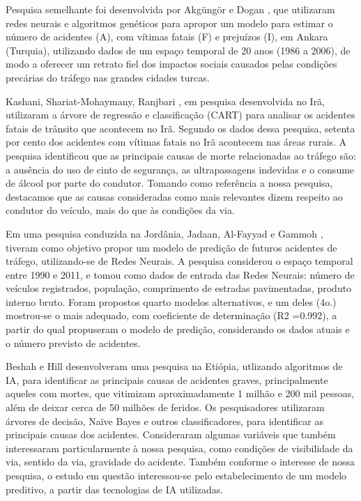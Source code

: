 Pesquisa semelhante foi desenvolvida por Akgüngör e Dogan \cite{akgungor2009artificial}, que utilizaram redes neurais e algoritmos genéticos para apropor um modelo para estimar o número de acidentes (A), com vítimas fatais (F) e prejuízos (I), em Ankara (Turquia), utilizando dados de um espaço temporal de 20 anos (1986 a 2006), de modo a oferecer um retrato fiel dos impactos sociais causados pelas condições precárias do tráfego nas grandes cidades turcas.

Kashani, Shariat-Mohaymany, Ranjbari \cite{tavakoli2011data}, em pesquisa desenvolvida no Irã, utilizaram a árvore de regressão e classificação (CART) para analisar os acidentes fatais de trânsito que acontecem no Irã. Segundo os dados dessa pesquisa, setenta por cento dos acidentes com vítimas fatais no Irã acontecem nas áreas rurais. A pesquisa identificou que as principais causas de morte relacionadas ao tráfego são: a ausência do uso de cinto de segurança, as ultrapassagens indevidas e o consume de álcool por parte do condutor. Tomando como referência a nossa pesquisa, destacamos que as causas consideradas como mais relevantes dizem respeito ao condutor do veículo, mais do que às condições da via.

Em uma pesquisa conduzida na Jordânia, Jadaan, Al-Fayyad e Gammoh \cite{jadaan2014prediction}, tiveram como objetivo propor um modelo de predição de futuros acidentes de tráfego, utilizando-se de Redes Neurais. A pesquisa considerou o espaço temporal entre 1990 e 2011, e tomou como dados de entrada das Redes Neurais: número de veículos registrados, população, comprimento de estradas pavimentadas, produto interno bruto. Foram propostos quarto modelos alternativos, e um deles (4o.) mostrou-se o mais adequado, com coeficiente de determinação (R2 =0.992), a partir do qual propuseram o modelo de predição, considerando os dados atuais e o número previsto de acidentes.

Beshah e Hill \cite{beshah2010mining} desenvolveram uma pesquisa na Etiópia, utlizando algoritmos de IA, para identificar as principais causas de acidentes graves, principalmente aqueles com mortes, que vitimizam aproximadamente 1 milhão e 200 mil pessoas, além de deixar cerca de 50 milhões de feridos. Os pesquisadores utilizaram árvores de decisão, Naïve Bayes e outros classificadores, para identificar as principais causas dos acidentes. Consideraram algumas variáveis que também interessaram particularmente à nossa pesquisa, como condições de visibilidade da via, sentido da via, gravidade do acidente. Também conforme o interesse de nossa pesquisa, o estudo em questão interessou-se pelo estabelecimento de um modelo preditivo, a partir das tecnologias de IA utilizadas.


